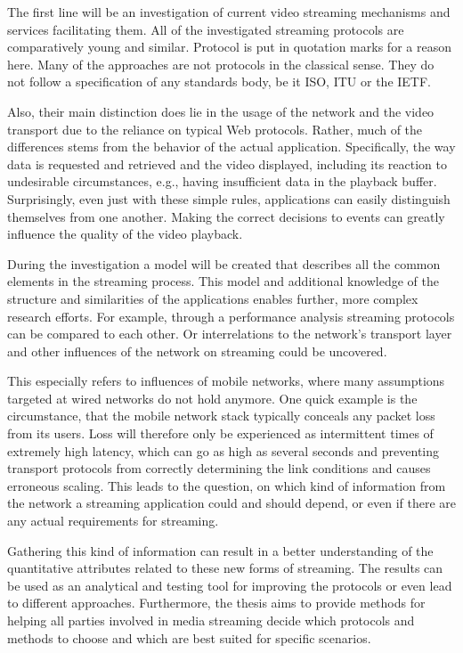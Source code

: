 The first line will be an investigation of current video streaming mechanisms and services facilitating them. All of the investigated streaming protocols are comparatively young and similar. Protocol is put in quotation marks for a reason here. Many of the approaches are not protocols in the classical sense. They do not follow a specification of any standards body, be it \gls{ISO}, \gls{ITU} or the \gls{IETF}. 

Also, their main distinction does lie in the usage of the network and the video transport due to the reliance on typical Web protocols. Rather, much of the differences stems from the behavior of the actual application. Specifically, the way data is requested and retrieved and the video displayed, including its reaction to undesirable circumstances, e.g., having insufficient data in the playback buffer. Surprisingly, even just with these simple rules, applications can easily distinguish themselves from one another. Making the correct decisions to events can greatly influence the quality of the video playback. 

During the investigation a model will be created that describes all the common elements in the streaming process. This model and additional knowledge of the structure and similarities of the applications enables further, more complex research efforts. For example, through a performance analysis streaming protocols can be compared to each other. Or interrelations to the network's transport layer and other influences of the network on streaming could be uncovered. 

This especially refers to influences of mobile networks, where many assumptions targeted at wired networks do not hold anymore. One quick example is the circumstance, that the mobile network stack typically conceals any packet loss from its users. Loss will therefore only be experienced as  intermittent times of extremely high latency, which can go as high as several seconds and preventing transport protocols from correctly determining the link conditions and causes erroneous scaling.
This leads to the question, on which kind of information from the network a streaming application could and should depend, or even if there are any actual requirements for streaming.

Gathering this kind of information can result in a better understanding of the quantitative attributes related to these new forms of streaming. The results can be used as an analytical and testing tool for improving the protocols or even lead to different approaches. Furthermore, the thesis aims to provide methods for helping all parties involved in media streaming decide which protocols and methods to choose and which are best suited for specific scenarios.


